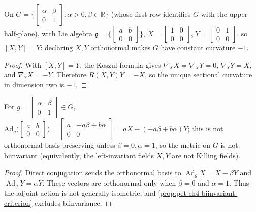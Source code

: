 \begin{example}
  \label{ex:pet-ch4-hyperbolic-lie-group}
  On $G=\Big\{\left[\begin{smallmatrix}\alpha&\beta\\0&1\end{smallmatrix}\right]:\alpha>0,\beta\in\mathbb{R}\Big\}$
  (whose first row identifies $G$ with the upper half-plane), with Lie algebra
  $\mathfrak g=\Big\{\left[\begin{smallmatrix}a&b\\0&0\end{smallmatrix}\right]\Big\}$,
  $X=\left[\begin{smallmatrix}1&0\\0&0\end{smallmatrix}\right]$,
  $Y=\left[\begin{smallmatrix}0&1\\0&0\end{smallmatrix}\right]$, so $[X,Y]=Y$: declaring
  $X,Y$ orthonormal makes $G$ have constant curvature $-1$.
\end{example}
\begin{proof}
  \sketch
  With $[X,Y]=Y$, the Koszul formula gives
  $\nabla_XX=\nabla_XY=0$, $\nabla_YY=X$, and $\nabla_YX=-Y$. Therefore
  $R(X,Y)Y=-X$, so the unique sectional curvature in dimension two is $-1$.
\end{proof}

\begin{proposition}
  \label{prop:pet-ch4-hyperbolic-lie-group-not-biinvariant}
  For $g=\left[\begin{smallmatrix}\alpha&\beta\\0&1\end{smallmatrix}\right]\in G$,
  $\mathrm{Ad}_g\big(\left[\begin{smallmatrix}a&b\\0&0\end{smallmatrix}\right]\big)
  =\left[\begin{smallmatrix}a&-a\beta+b\alpha\\0&0\end{smallmatrix}\right]=aX+(-a\beta+b\alpha)Y$;
  this is not orthonormal-basis-preserving unless $\beta=0,\alpha=1$, so the
  metric on $G$ is not biinvariant (equivalently, the left-invariant fields
  $X,Y$ are not Killing fields).
\end{proposition}
\begin{proof}
  \sketch
  Direct conjugation sends the orthonormal basis to
  $\operatorname{Ad}_gX=X-\beta Y$ and
  $\operatorname{Ad}_gY=\alpha Y$. These vectors are orthonormal only when
  $\beta=0$ and $\alpha=1$. Thus the adjoint action is not generally isometric,
  and \cref{prop:pet-ch4-biinvariant-criterion} excludes biinvariance.
\end{proof}

